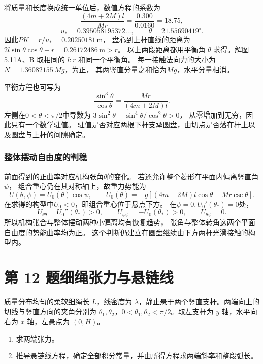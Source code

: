 \documentclass[UTF8,fontset=fandol,a4paper,11pt]{ctexart}
\newcommand{\tagline}[1]{\noindent{\small\color{muted}#1}\par}
\begin{document}
将质量和长度换成统一单位后，数值方程的系数为
\[
\frac{(4m+2M)l}{Mr}=\frac{0.300}{0.0160}=18.75,
\]
\[
u_*=0.395058195372\ldots,\qquad
\theta=21.55690419^\circ.
\]
因此$PK=r/u_*=0.20250181\,\mathrm m$，
盘心到上杆直线的距离为
$2l\sin\theta\cos\theta-r=0.26172486\,\mathrm m>r$。
以上两段距离都用平衡角 $\theta$ 求得。解图5.11A、B 取相同的 $l:r$ 和同一个平衡角。
每一接触法向力的大小为$N=1.36082155\,Mg$，为正，
其两竖直分量之和恰为$Mg$，水平分量相消。

平衡方程也可写为
\[
\frac{\sin^3\theta}{\cos\theta}
=\frac{Mr}{(4m+2M)l}.
\]
左侧在$0<\theta<\pi/2$中导数为
$3\sin^2\theta+\sin^4\theta/\cos^2\theta>0$，
从零增加到无穷，因此只有一个数学驻值。
驻值是否对应两根下杆支承圆盘，由切点是否落在杆上以及圆盘与上杆的间隙确定。

\subsubsection*{整体摆动自由度的判稳}
前面得到的正曲率对应机构张角$\theta$的变化。
若还允许整个菱形在平面内偏离竖直角$\psi$，
组合重心仍在其对称轴上，故重力势能为
\[
U(\theta,\psi)=U_0(\theta)\cos\psi,
\qquad
U_0(\theta)=-g[(4m+2M)l\cos\theta-Mr\csc\theta].
\]
在求得的构型中$U_0<0$，即组合重心位于悬点下方。
在$\psi=0,U_0'(\theta_*)=0$处，
\[
U_{\theta\theta}=U_0''(\theta_*)>0,\qquad
U_{\psi\psi}=-U_0(\theta_*)>0,\qquad
U_{\theta\psi}=0.
\]
所以机构张合与整体摆动两种小偏离均有恢复趋势，
张角与整体转角这两个平面自由度的势能曲率均为正。
这个判断仍建立在圆盘继续由下方两杆光滑接触的构型内。




\section*{第 12 题\quad 细绳张力与悬链线}

\tagline{M-05-12}

质量分布均匀的柔软细绳长 $L$，线密度为 $\lambda$，静止悬于两个竖直支杆。两端向上的切线与竖直方向的夹角分别为 $\theta_1,\theta_2$，$0<\theta_1,\theta_2<\pi/2$。取左支杆为 $y$ 轴，水平向右为 $x$ 轴，左悬点为 $(0,H)$。
\begin{enumerate}\item 求两端张力。\item 推导悬链线方程，确定全部积分常量，并由所得方程求两端斜率和整段弧长。\end{enumerate}
\end{document}
